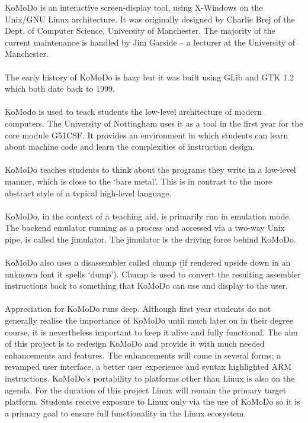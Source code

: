 KoMoDo is an interactive screen-display tool, using X-Windows on the Unix/GNU Linux architecture. It was originally designed by Charlie Brej of the Dept. of Computer Science, University of Manchester. The majority of the current maintenance is handled by Jim Garside -- a lecturer at the University of Manchester.\\\\
%
The early history of KoMoDo is hazy but it was built using GLib and GTK 1.2 which both date back to 1999.\\\\
%
KoModo is used to teach students the low-level architecture of modern computers. The University of Nottingham uses it as a tool in the first year for the core module G51CSF. It provides an environment in which students can learn about machine code and learn the complexities of instruction design.\\\\ 
%
KoMoDo teaches students to think about the programs they write in a low-level manner, which is close to the `bare metal'. This is in contrast to the more abstract style of a typical high-level language.\\\\
%
KoMoDo, in the context of a teaching aid, is primarily run in emulation mode. The backend emulator running as a process and accessed via a two-way Unix pipe, is called the jimulator. The jimulator is the driving force behind KoMoDo.\\\\
%
KoMoDo also uses a disassembler called chump (if rendered upside down in an unknown font it spells `dump'). Chump is used to convert the resulting assembler instructions back to something that KoMoDo can use and display to the user.\\\\
%
Appreciation for KoMoDo runs deep. Although first year students do not generally realise the importance of KoMoDo until much later on in their degree course, it is nevertheless  important to keep it alive and fully functional.
%
The aim of this project is to redesign KoMoDo and provide it with much needed enhancements and features. The enhancements will come in several forms; a revamped user interface, a better user experience and syntax highlighted ARM instructions. KoMoDo's portability to platforms other than Linux is also on the agenda. For the duration of this project Linux will remain the primary target platform. Students receive exposure to Linux only via the use of KoMoDo so it is a primary goal to ensure full functionality in the Linux ecosystem.

